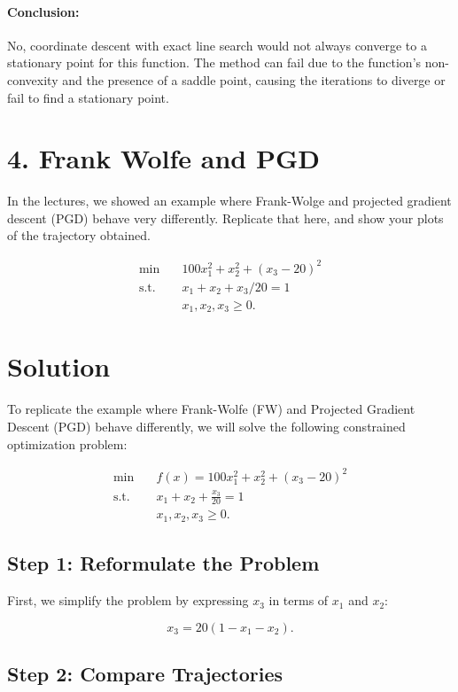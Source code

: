 \documentclass{article}
\begin{document}
\paragraph{Conclusion:}
No, coordinate descent with exact line search would not always converge to a stationary point for this function. The method can fail due to the function's non-convexity and the presence of a saddle point, causing the iterations to diverge or fail to find a stationary point.

\section*{4. Frank Wolfe and PGD} In the lectures, we showed an example where Frank-Wolge and projected gradient descent (PGD) behave very differently. Replicate that here, and show your plots of the trajectory obtained.

\begin{align*}
\min \quad & 100x_1^2 + x_2^2 + (x_3 - 20)^2 \\
\text{s.t.} \quad & x_1 + x_2 + x_3/20 = 1 \\
& x_1, x_2, x_3 \geq 0.
\end{align*}

\section*{Solution}

To replicate the example where Frank-Wolfe (FW) and Projected Gradient Descent (PGD) behave differently, we will solve the following constrained optimization problem:

\begin{align*}
\min \quad & f(x) = 100x_1^2 + x_2^2 + (x_3 - 20)^2 \\
\text{s.t.} \quad & x_1 + x_2 + \frac{x_3}{20} = 1 \\
& x_1, x_2, x_3 \geq 0.
\end{align*}

\subsection*{Step 1: Reformulate the Problem}
First, we simplify the problem by expressing $x_3$ in terms of $x_1$ and $x_2$:

\[x_3 = 20(1 - x_1 - x_2).\]

\subsection*{Step 2: Compare Trajectories}
\end{document}
